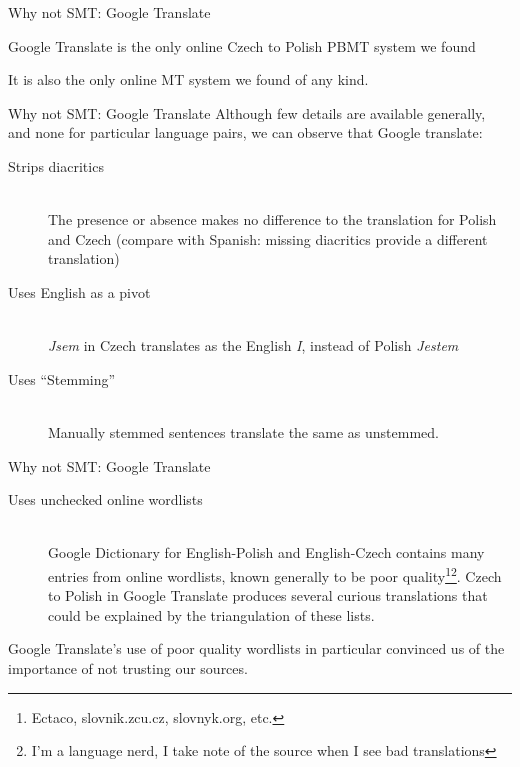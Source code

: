 \documentclass{beamer}
\begin{document}
\begin{frame}{Why not SMT: Google Translate}

Google Translate is the only online Czech to Polish PBMT system we found

It is also the only online MT system we found of any kind.

\end{frame}
\begin{frame}{Why not SMT: Google Translate}
Although few details are available generally, and none for particular language
pairs, we can observe that Google translate:

\begin{description}
  \item[Strips diacritics] \hfill \\
  The presence or absence makes no difference to the translation for Polish and Czech
  (compare with Spanish: missing diacritics provide a different translation)
  \item[Uses English as a pivot] \hfill \\
  {\it Jsem} in Czech translates as the English {\it I}, instead of Polish {\it Jestem}
  \item[Uses ``Stemming''] \hfill \\
  Manually stemmed sentences translate the same as unstemmed.
\end{description}

\end{frame}
\begin{frame}{Why not SMT: Google Translate}
\begin{description}
  \item[Uses unchecked online wordlists] \hfill \\
  Google Dictionary for English-Polish and English-Czech contains many entries from
  online wordlists, known generally to be poor quality\footnote{Ectaco, 
  slovnik.zcu.cz, slovnyk.org, etc.}\footnote{I'm a language nerd, I take note 
  of the source when I see bad translations}. Czech to Polish in Google
  Translate produces several curious translations that could be explained by the
  triangulation of these lists.
\end{description}

Google Translate's use of poor quality wordlists in particular convinced us 
of the importance of not trusting our sources.
\end{frame}
\end{document}
